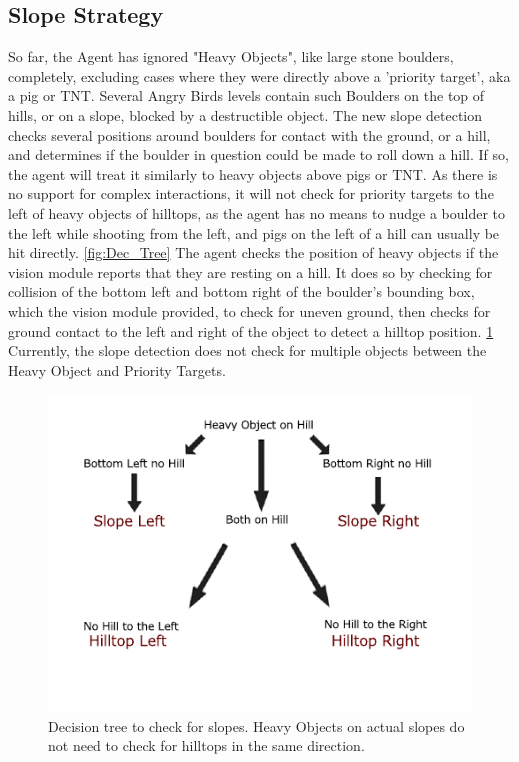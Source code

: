 \subsection{Slope Strategy}\label{subsec:slopeStrategy}
So far, the Agent has ignored "Heavy Objects", like large stone boulders, completely, excluding cases where they were directly above a 'priority target', aka a pig or TNT. Several Angry Birds levels contain such Boulders on the top of hills, or on a slope, blocked by a destructible object. The new slope detection checks several positions around boulders for contact with the ground, or a hill, and determines if the boulder in question could be made to roll down a hill. If so, the agent will treat it similarly to heavy objects above pigs or TNT. \linebreak
As there is no support for complex interactions, it will not check for priority targets to the left of heavy objects of hilltops, as the agent has no means to nudge a boulder to the left while shooting from the left, and pigs on the left of a hill can usually be hit directly.
\ref{fig:Dec_Tree}
The agent checks the position of heavy objects if the vision module reports that they are resting on a hill. It does so by checking for collision of the bottom left and bottom right of the boulder's bounding box, which the vision module provided, to check for uneven ground, then checks for ground contact to the left and right of the object to detect a hilltop position. 
\ref{fig:slopeEx}
Currently, the slope detection does not check for multiple objects between the Heavy Object and Priority Targets.
\begin{figure}
	\includegraphics[width=\textwidth]{img/Dec_Tree.pdf}
	\caption{Decision tree to check for slopes. Heavy Objects on actual slopes do not need to check for hilltops in the same direction.}\label{fig:slopeEx}
\end{figure}

